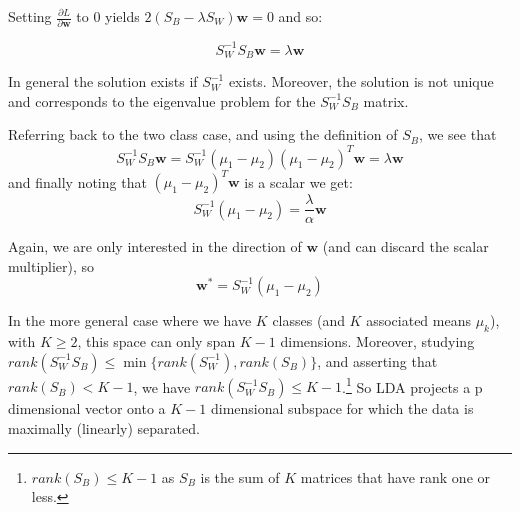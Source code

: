 \documentclass{article}
\begin{document}
Setting $\frac{\partial L}{\partial \mathbf{w}}$ to $0$ yields $2(S_B - \lambda S_W)\mathbf{w} = 0$ and so:

\begin{equation}
  S_W^{-1}S_B \mathbf{w} = \lambda \mathbf{w}
\end{equation}

In general the solution exists if $S_W^{-1}$ exists. Moreover, the solution is not unique and corresponds to the eigenvalue problem for the $S_W^{-1}S_B$ matrix.

Referring back to the two class case, and using the definition of $S_B$, we see that
$$
S_W^{-1}S_B \mathbf{w} = S_W^{-1}(\mu_1 - \mu_2)(\mu_1 - \mu_2)^T \mathbf{w} = \lambda \mathbf{w}
$$and finally noting that $(\mu_1 - \mu_2)^T \mathbf{w}$ is a scalar we get:
\begin{equation}
  S_W^{-1} (\mu_1 - \mu_2) = \frac{\lambda}{\alpha} \mathbf{w}
\end{equation}

Again, we are only interested in the direction of $\mathbf{w}$ (and can discard the scalar multiplier), so
$$
\mathbf{w^*} = S_W^{-1} (\mu_1 - \mu_2)
$$

In the more general case where we have $K$ classes (and $K$ associated means $\mu_k$), with $K \geq 2$, this space can only span $K-1$ dimensions. Moreover, studying $rank(S_W^{-1}S_B) \leq \min\{ rank(S_W^{-1}), rank(S_B) \}$, \cite{petersen2008matrix} and asserting that $rank(S_B) < K-1$, we have $rank(S_W^{-1}S_B) \leq K-1$.\footnote{$rank(S_B) \leq K-1$ as $S_B$ is the sum of $K$ matrices that have rank one or less.} So LDA projects a p dimensional vector onto a $K-1$ dimensional subspace for which the data is maximally (linearly) separated.

\end{document}
